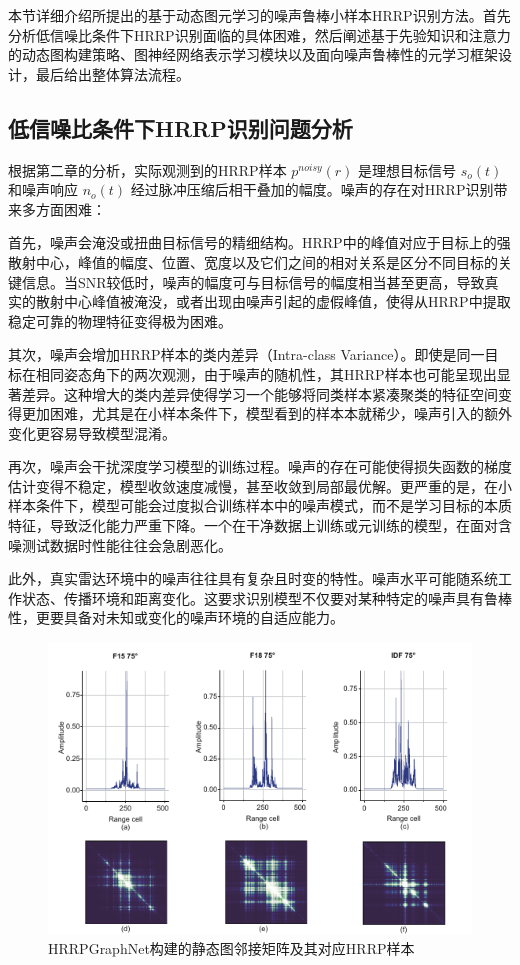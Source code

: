 本节详细介绍所提出的基于动态图元学习的噪声鲁棒小样本HRRP识别方法。首先分析低信噪比条件下HRRP识别面临的具体困难，然后阐述基于先验知识和注意力的动态图构建策略、图神经网络表示学习模块以及面向噪声鲁棒性的元学习框架设计，最后给出整体算法流程。

\subsection{低信噪比条件下HRRP识别问题分析}
\label{subsec:noise_challenge_analysis}

根据第二章的分析，实际观测到的HRRP样本 $p^{noisy}(r)$ 是理想目标信号 $s_o(t)$ 和噪声响应 $n_o(t)$ 经过脉冲压缩后相干叠加的幅度。噪声的存在对HRRP识别带来多方面困难：

首先，噪声会淹没或扭曲目标信号的精细结构。HRRP中的峰值对应于目标上的强散射中心，峰值的幅度、位置、宽度以及它们之间的相对关系是区分不同目标的关键信息。当SNR较低时，噪声的幅度可与目标信号的幅度相当甚至更高，导致真实的散射中心峰值被淹没，或者出现由噪声引起的虚假峰值，使得从HRRP中提取稳定可靠的物理特征变得极为困难。

其次，噪声会增加HRRP样本的类内差异（Intra-class Variance）。即使是同一目标在相同姿态角下的两次观测，由于噪声的随机性，其HRRP样本也可能呈现出显著差异。这种增大的类内差异使得学习一个能够将同类样本紧凑聚类的特征空间变得更加困难，尤其是在小样本条件下，模型看到的样本本就稀少，噪声引入的额外变化更容易导致模型混淆。

再次，噪声会干扰深度学习模型的训练过程。噪声的存在可能使得损失函数的梯度估计变得不稳定，模型收敛速度减慢，甚至收敛到局部最优解。更严重的是，在小样本条件下，模型可能会过度拟合训练样本中的噪声模式，而不是学习目标的本质特征，导致泛化能力严重下降。一个在干净数据上训练或元训练的模型，在面对含噪测试数据时性能往往会急剧恶化。

此外，真实雷达环境中的噪声往往具有复杂且时变的特性。噪声水平可能随系统工作状态、传播环境和距离变化。这要求识别模型不仅要对某种特定的噪声具有鲁棒性，更要具备对未知或变化的噪声环境的自适应能力。

\begin{figure}[h]
    \centering
    \includegraphics[width=0.8\linewidth]{figures/hrrpgraphnet.pdf}
    \caption{HRRPGraphNet构建的静态图邻接矩阵及其对应HRRP样本}
    \label{fig:dataset_chap3}
\end{figure}

